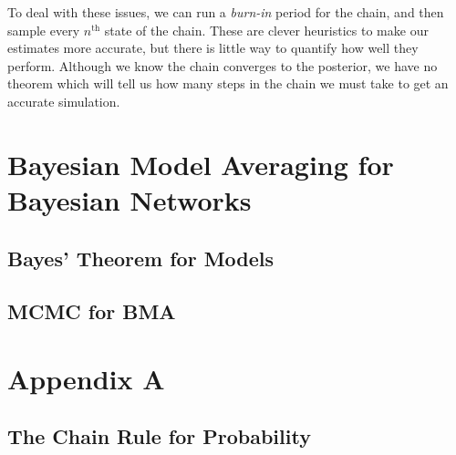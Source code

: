 \documentclass[12pt,twoside]{reedthesis}
\begin{document}
			To deal with these issues, we can run a {\em burn-in} period for the chain, and then sample every $n^{\text{th}}$ state of the chain. These are clever heuristics to make our estimates more accurate, but there is little way to quantify how well they perform. Although we know the chain converges to the posterior, we have no theorem which will tell us how many steps in the chain we must take to get an accurate simulation.

\chapter{Bayesian Model Averaging for Bayesian Networks}

	\section{Bayes' Theorem for Models}

	\section{MCMC for BMA}

    \appendix
      \chapter{Appendix A}
      \section{The Chain Rule for Probability}



  \backmatter %
\end{document}

